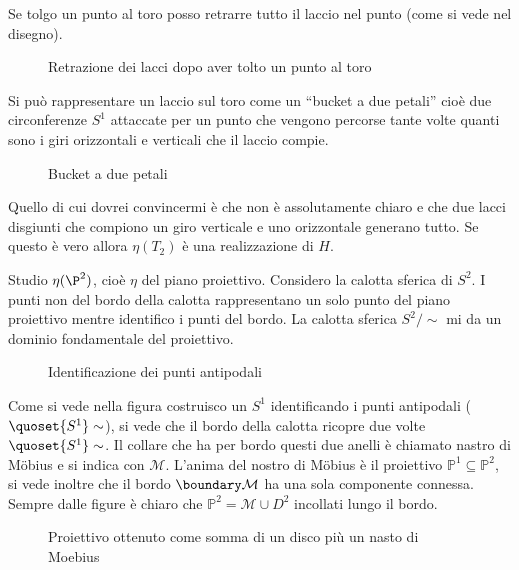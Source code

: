 Se tolgo un punto al toro posso retrarre tutto il laccio nel punto (come si vede nel disegno).

\begin{figure}
	\centering 
	
	\caption{Retrazione dei lacci dopo aver tolto un punto al toro}
\end{figure}

Si può rappresentare un laccio sul toro come un ``bucket a due petali'' cioè due circonferenze $S^{1}$ attaccate per un punto che vengono percorse tante volte quanti sono i giri
orizzontali e verticali che il laccio compie.

\begin{figure}
	\centering 
	
	\caption{Bucket a due petali}
\end{figure}

Quello di cui dovrei convincermi è che non è assolutamente chiaro e che due lacci disgiunti che compiono un giro verticale e uno orizzontale generano tutto. Se questo è vero allora $\eta(T_{2})$ 
è una realizzazione di $H$.


Studio $\eta(\P^{2})$, cioè $\eta$ del piano proiettivo. Considero la calotta sferica di $S^2$. I punti non del bordo della calotta rappresentano un solo punto del piano proiettivo mentre
identifico i punti del bordo. La calotta sferica $S^{2}/\sim$ mi da un dominio fondamentale del proiettivo.

\begin{figure}
	\centering 
	
	\caption{Identificazione dei punti antipodali}
\end{figure}

Come si vede nella figura costruisco un $S^1$ identificando i punti antipodali ($\quoset{S^1}\sim$), si vede che il bordo della calotta ricopre due volte $\quoset{S^1}\sim$. Il collare che ha per bordo questi due anelli
è chiamato nastro di Möbius e si indica con $\mathcal{M}$. 
L'anima del nostro di Möbius è il proiettivo $\mathbb{P}^1 \subseteq \mathbb{P}^2 $, si vede inoltre che il bordo $\boundary \mathcal{M}$ ha una sola componente connessa.
Sempre dalle figure è chiaro che $\mathbb{P}^2 = \mathcal{M} \cup D^{2}$ incollati lungo il bordo.

\begin{figure}
	\centering 
	
	\caption{Proiettivo ottenuto come somma di un disco più un nasto di Moebius}
\end{figure}

